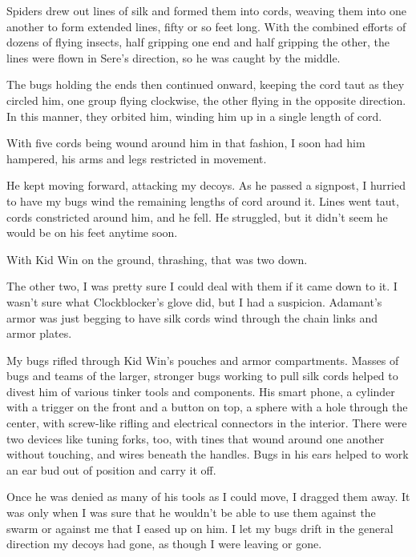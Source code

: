 Spiders drew out lines of silk and formed them into cords, weaving them into one another to form extended lines, fifty or so feet long.  With the combined efforts of dozens of flying insects, half gripping one end and half gripping the other, the lines were flown in Sere's direction, so he was caught by the middle.



The bugs holding the ends then continued onward, keeping the cord taut as they circled him, one group flying clockwise, the other flying in the opposite direction.  In this manner, they orbited him, winding him up in a single length of cord.



With five cords being wound around him in that fashion, I soon had him hampered, his arms and legs restricted in movement.



He kept moving forward, attacking my decoys.  As he passed a signpost, I hurried to have my bugs wind the remaining lengths of cord around it.  Lines went taut, cords constricted around him, and he fell.  He struggled, but it didn't seem he would be on his feet anytime soon.



With Kid Win on the ground, thrashing, that was two down.



The other two, I was pretty sure I could deal with them if it came down to it.  I wasn't sure what Clockblocker's glove did, but I had a suspicion.  Adamant's armor was just begging to have silk cords wind through the chain links and armor plates.



My bugs rifled through Kid Win's pouches and armor compartments.  Masses of bugs and teams of the larger, stronger bugs working to pull silk cords helped to divest him of various tinker tools and components.  His smart phone, a cylinder with a trigger on the front and a button on top, a sphere with a hole through the center, with screw-like rifling and electrical connectors in the interior.  There were two devices like tuning forks, too, with tines that wound around one another without touching, and wires beneath the handles.  Bugs in his ears helped to work an ear bud out of position and carry it off.



Once he was denied as many of his tools as I could move, I dragged them away.  It was only when I was sure that he wouldn't be able to use them against the swarm or against me that I eased up on him.  I let my bugs drift in the general direction my decoys had gone, as though I were leaving or gone.



